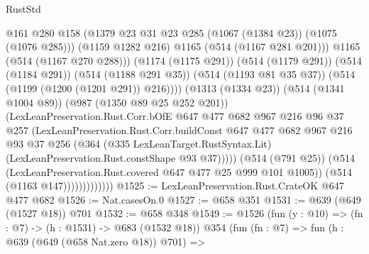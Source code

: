 \begin{lexlean}{RustStd}
\begin{coremodule}
                                    @161
                                    @280
                                    @158
                                    (@1379
                                      @23
                                      @31
                                      @23
                                      @285
                                      (@1067 (@1384 @23))
                                      (@1075 (@1076 @285)))
                                    (@1159 @1282 @216)
                                    @1165
                                    (@514 (@1167 @281 @201)))
                                  @1165
                                  (@514 (@1167 @270 @288)))
                                (@1174 (@1175 @291))
                                (@514 (@1179 @291))
                                (@514 (@1184 @291))
                                (@514 (@1188 @291 @35))
                                (@514 (@1193 @81 @35 @37))
                                (@514 (@1199 (@1200 (@1201 @291)) @216))))
                            (@1313 (@1334 @23))
                            (@514 (@1341 @1004 @89))
                            (@987 (@1350 @89 @25 @252 @201))
                            (LexLeanPreservation.Rust.Corr.bOfE
                              @647
                              @477
                              @682
                              @967
                              @216
                              @96
                              @37
                              @257
                              (LexLeanPreservation.Rust.Corr.buildConst
                                @647
                                @477
                                @682
                                @967
                                @216
                                @93
                                @37
                                @256
                                (@364
                                  (@335 LexLeanTarget.RustSyntax.Lit)
                                  (LexLeanPreservation.Rust.constShape @93 @37)))))
                          (@514 (@791 @25))
                          (@514 (LexLeanPreservation.Rust.covered @647 @477 @25 @999 @101 @1005))
                          (@514 (@1163 @147)))))))))))))
@1525 := LexLeanPreservation.Rust.CrateOK @647 @477 @682
@1526 := Nat.casesOn.{0}
@1527 := @658 @351
@1531 := @639 (@649 (@1527 @18)) @701
@1532 := @658 @348
@1549 := @1526
    (fun (y : @10) => (fn : @7) -> (h : @1531) -> @683 (@1532 @18))
    @354
    (fun (fn : @7) =>
    fun (h : @639 (@649 (@658 Nat.zero @18)) @701) =>

\end{coremodule}
\end{lexlean}
